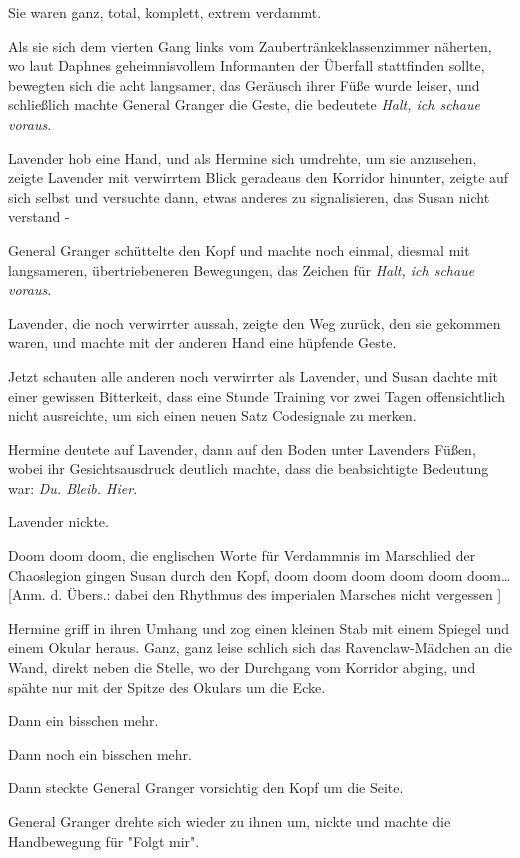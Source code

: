 {Sie waren ganz, total, komplett, extrem verdammt.

Als sie sich dem vierten Gang links vom Zaubertränkeklassenzimmer näherten, wo laut Daphnes geheimnisvollem Informanten der Überfall stattfinden sollte, bewegten sich die acht langsamer, das Geräusch ihrer Füße wurde leiser, und schließlich machte General Granger die Geste, die bedeutete \emph{Halt, ich schaue voraus}.

Lavender hob eine Hand, und als Hermine sich umdrehte, um sie anzusehen, zeigte Lavender mit verwirrtem Blick geradeaus den Korridor hinunter, zeigte auf sich selbst und versuchte dann, etwas anderes zu signalisieren, das Susan nicht verstand -

General Granger schüttelte den Kopf und machte noch einmal, diesmal mit langsameren, übertriebeneren Bewegungen, das Zeichen für \emph{Halt, ich schaue voraus}.

Lavender, die noch verwirrter aussah, zeigte den Weg zurück, den sie gekommen waren, und machte mit der anderen Hand eine hüpfende Geste.

Jetzt schauten alle anderen noch verwirrter als Lavender, und Susan dachte mit einer gewissen Bitterkeit, dass eine Stunde Training vor zwei Tagen offensichtlich nicht ausreichte, um sich einen neuen Satz Codesignale zu merken.

Hermine deutete auf Lavender, dann auf den Boden unter Lavenders Füßen, wobei ihr Gesichtsausdruck deutlich machte, dass die beabsichtigte Bedeutung war: \emph{Du. Bleib. Hier}.

Lavender nickte.

Doom doom doom, die englischen Worte für Verdammnis im Marschlied der Chaoslegion gingen Susan durch den Kopf, doom doom doom doom doom doom… {[}Anm. d. Übers.: dabei den Rhythmus des imperialen Marsches nicht vergessen {]}

Hermine griff in ihren Umhang und zog einen kleinen Stab mit einem Spiegel und einem Okular heraus. Ganz, ganz leise schlich sich das Ravenclaw-Mädchen an die Wand, direkt neben die Stelle, wo der Durchgang vom Korridor abging, und spähte nur mit der Spitze des Okulars um die Ecke.

Dann ein bisschen mehr.

Dann noch ein bisschen mehr.

Dann steckte General Granger vorsichtig den Kopf um die Seite.

General Granger drehte sich wieder zu ihnen um, nickte und machte die Handbewegung für "Folgt mir".

}
